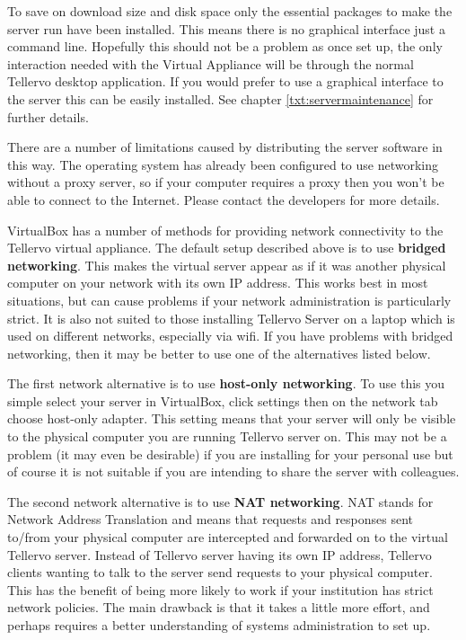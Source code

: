 To save on download size and disk space only the essential packages to make the server run have been installed.  This means there is no graphical interface just a command line.  Hopefully this should not be a problem as once set up, the only interaction needed with the Virtual Appliance will be through the normal Tellervo desktop application.  If you would prefer to use a graphical interface to the server this can be easily installed.  See chapter \ref{txt:servermaintenance} for further details.

There are a number of limitations caused by distributing the server software in this way. The operating system has already been configured to use networking without a proxy server, so if your computer requires a proxy then you won't be able to connect to the Internet.  Please contact the developers for more details.

VirtualBox has a number of methods for providing network connectivity to the Tellervo virtual appliance.  The default setup described above is to use \textbf{bridged networking}.  This makes the virtual server appear as if it was another physical computer on your network with its own IP address.  This works best in most situations, but can cause problems if your network administration is particularly strict.  It is also not suited to those installing Tellervo Server on a laptop which is used on different networks, especially via wifi.  If you have problems with bridged networking, then it may be better to use one of the alternatives listed below.

The first network alternative is to use \textbf{host-only networking}.  To use this you simple select your server in VirtualBox, click settings then on the network tab choose host-only adapter.  This setting means that your server will only be visible to the physical computer you are running Tellervo server on.  This may not be a problem (it may even be desirable) if you are installing for your personal use but of course it is not suitable if you are intending to share the server with colleagues.

The second network alternative is to use \textbf{NAT networking}.  NAT stands for Network Address Translation and means that requests and responses sent to/from your physical computer are intercepted and forwarded on to the virtual Tellervo server.  Instead of Tellervo server having its own IP address, Tellervo clients wanting to talk to the server send requests to your physical computer.  This has the benefit of being more likely to work if your institution has strict network policies.  The main drawback is that it takes a little more effort, and perhaps requires a better understanding of systems administration to set up.  

